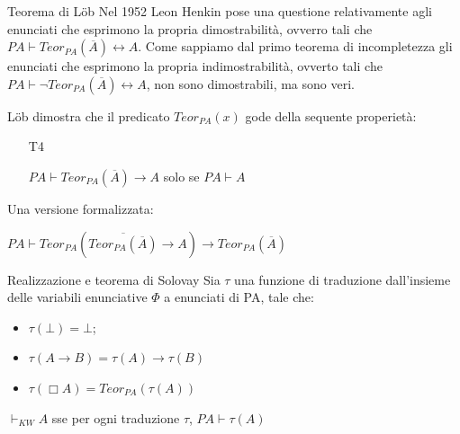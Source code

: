 \documentclass{beamer}
\begin{document}
\begin{frame}{Teorema di Löb}
Nel 1952 Leon Henkin pose una questione relativamente agli enunciati che esprimono la propria dimostrabilità, ovverro tali che $PA \vdash Teor_{PA}(\overline{A}) \leftrightarrow A$. Come sappiamo dal primo teorema di incompletezza gli enunciati che esprimono la propria indimostrabilità, ovverto tali che $PA \vdash \neg Teor_{PA}(\overline{A}) \leftrightarrow A$, non sono dimostrabili, ma sono veri.

Löb dimostra che il predicato $Teor_{PA}(x)$ gode della sequente properietà:
\begin{exampleblock}{}
\begin{itemize}
\item[T4] 
\begin{center}
$PA \vdash Teor_{PA}(\overline{A}) \to A$ solo se $PA \vdash A$  
\end{center}
\end{itemize}
\end{exampleblock}
Una versione formalizzata:
\begin{center}
    $PA \vdash Teor_{PA}(\overline{Teor_{PA}(\overline{A})} \to A) \to Teor_{PA}(\overline{A})$
\end{center}
\end{frame}


\begin{frame}{Realizzazione e teorema di Solovay}
Sia $\tau$ una funzione di traduzione dall’insieme delle variabili enunciative $\Phi$ a enunciati di PA, tale che:
\begin{itemize}
  \item $\tau(\bot)=\bot$;
  \item $\tau(A\to B)=\tau(A) \to \tau(B)$
  \item $\tau(\Box A) = Teor_{PA}(\tau(A))$
\end{itemize}

 \begin{teorema}
   \begin{center}
        $\vdash_{KW}A$ sse per ogni traduzione $\tau$, $PA \vdash \tau(A)$
   \end{center} 
 \end{teorema}
\end{frame}
\end{document}
